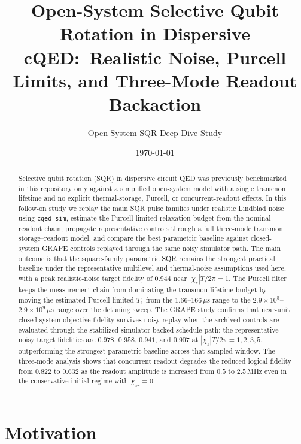 \documentclass[twocolumn,prl,aps,floatfix]{revtex4-2}
\begin{document}
\title{Open-System Selective Qubit Rotation in Dispersive cQED:\
Realistic Noise, Purcell Limits, and Three-Mode Readout Backaction}

\author{Open-System SQR Deep-Dive Study}

\date{\today}

\begin{abstract}
Selective qubit rotation (SQR) in dispersive circuit QED was previously benchmarked in this
repository only against a simplified open-system model with a single transmon lifetime and no
explicit thermal-storage, Purcell, or concurrent-readout effects. In this follow-on study we replay
the main SQR pulse families under realistic Lindblad noise using \texttt{cqed\_sim}, estimate the
Purcell-limited relaxation budget from the nominal readout chain, propagate representative controls
through a full three-mode transmon--storage--readout model, and compare the best parametric baseline
against closed-system GRAPE controls replayed through the same noisy simulator path. The main outcome
is that the square-family parametric SQR remains the strongest practical baseline under the representative
multilevel and thermal-noise assumptions used here, with a peak realistic-noise target fidelity of
$0.944$ near $|\chi_s|T/2\pi = 1$. The Purcell filter keeps the measurement chain from dominating the
transmon lifetime budget by moving the estimated Purcell-limited $T_1$ from the $1.66$--$166\,\mu$s range
to the $2.9\times 10^5$--$2.9\times 10^9\,\mu$s range over the detuning sweep. The GRAPE study confirms
that near-unit closed-system objective fidelity survives noisy replay when the archived controls are
evaluated through the stabilized simulator-backed schedule path: the representative noisy target fidelities
are $0.978$, $0.958$, $0.941$, and $0.907$ at $|\chi_s|T/2\pi = 1, 2, 3, 5$, outperforming the strongest
parametric baseline across that sampled window. The three-mode analysis shows that concurrent readout degrades the
reduced logical fidelity from $0.822$ to $0.632$ as the readout amplitude is increased from
$0.5$ to $2.5\,$MHz even in the conservative initial regime with $\chi_{sr}=0$.
\end{abstract}

\maketitle

\section{Motivation}
\end{document}
